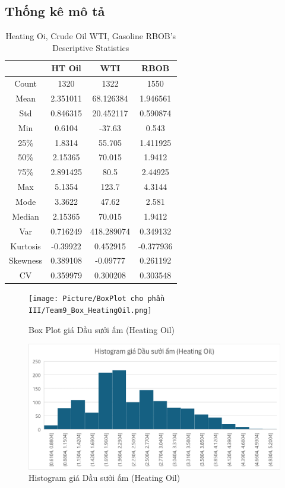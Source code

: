 \documentclass[conference]{IEEEtran}
\begin{document}
\subsection{Thống kê mô tả}
\begin{table}[H]
  \centering
  \caption{Heating Oi, Crude Oil WTI, Gasoline RBOB’s Descriptive Statistics}
\begin{tabular}{|>{}c|c|c|c|}
    \hline
      & HT Oil& WTI& RBOB\\ \hline
     Count & 1320
& 1322
& 1550
\\ \hline
     Mean & 2.351011
& 68.126384
& 1.946561
\\ \hline
     Std & 0.846315
& 20.452117
& 0.590874
\\ \hline
     Min & 0.6104
& -37.63
& 0.543
\\ \hline
     25\% & 1.8314
& 55.705
& 1.411925
\\ \hline
     50\% & 2.15365
& 70.015
& 1.9412
\\ \hline
     75\% & 2.891425
& 80.5
& 2.44925
\\ \hline
     Max & 5.1354
& 123.7
& 4.3144
\\ \hline
 Mode& 3.3622
& 47.62
&2.581
\\\hline
 Median& 2.15365
& 70.015
&1.9412
\\\hline
 Var& 0.716249
& 418.289074
&0.349132
\\\hline
 Kurtosis& -0.39922
& 0.452915
&-0.377936
\\\hline
 Skewness& 0.389108
& -0.09777
&0.261192
\\\hline
 CV& 0.359979
& 0.300208
&0.303548
\\\hline
\end{tabular}
\end{table}

\begin{figure}[H]
    \centering
    \begin{minipage}{0.23\textwidth}
    \centering
    \texttt{[image: Picture/BoxPlot cho phần III/Team9\_Box\_HeatingOil.png]}
    \caption{Box Plot giá Dầu sưởi ấm (Heating Oil)}
    \label{fig:1}
    \end{minipage}
    \hfill
    \begin{minipage}{0.23\textwidth}
    \centering
    \includegraphics[width=1\textwidth]{Picture/Histogram cho ở phần III/Team9_His_HeatingOil.png}
    \caption{Histogram giá Dầu sưởi ấm (Heating Oil)}
    \label{fig:2}
    \end{minipage}
\end{figure}
\end{document}
